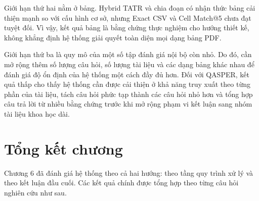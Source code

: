 \documentclass[../DoAn.tex]{subfiles}
\begin{document}
Giới hạn thứ hai nằm ở bảng. Hybrid TATR và chia đoạn có nhận thức bảng cải thiện mạnh so với cấu hình cơ sở, nhưng Exact CSV và Cell Match@5 chưa đạt tuyệt đối. Vì vậy, kết quả bảng là bằng chứng thực nghiệm cho hướng thiết kế, không khẳng định hệ thống giải quyết toàn diện mọi dạng bảng PDF.

Giới hạn thứ ba là quy mô của một số tập đánh giá nội bộ còn nhỏ. Do đó, cần mở rộng thêm số lượng câu hỏi, số lượng tài liệu và các dạng bảng khác nhau để đánh giá độ ổn định của hệ thống một cách đầy đủ hơn. Đối với QASPER, kết quả thấp cho thấy hệ thống cần được cải thiện ở khả năng truy xuất theo từng phần của tài liệu, tách câu hỏi phức tạp thành các câu hỏi nhỏ hơn và tổng hợp câu trả lời từ nhiều bằng chứng trước khi mở rộng phạm vi kết luận sang nhóm tài liệu khoa học dài.

\section{Tổng kết chương}

Chương 6 đã đánh giá hệ thống theo cả hai hướng: theo tầng quy trình xử lý và theo kết luận đầu cuối. Các kết quả chính được tổng hợp theo từng câu hỏi nghiên cứu như sau.
\end{document}

